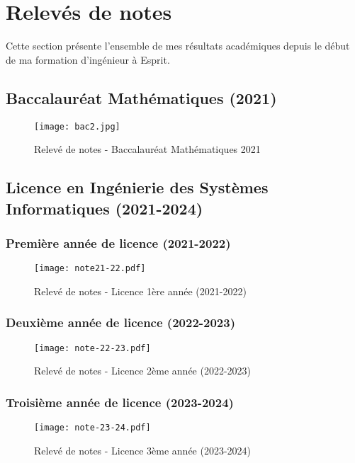 \documentclass[12pt,a4paper]{report}
\begin{document}
\section{Relevés de notes}

Cette section présente l'ensemble de mes résultats académiques depuis le début de ma formation d'ingénieur à Esprit.

\subsection{Baccalauréat Mathématiques (2021)}

\begin{figure}[H]
    \centering
    \texttt{[image: bac2.jpg]}
    \caption{Relevé de notes - Baccalauréat Mathématiques 2021}
    \label{fig:transcript_bac}
\end{figure}

\subsection{Licence en Ingénierie des Systèmes Informatiques (2021-2024)}

\subsubsection{Première année de licence (2021-2022)}
\begin{figure}[H]
    \centering
    \texttt{[image: note21-22.pdf]}
    \caption{Relevé de notes - Licence 1ère année (2021-2022)}
    \label{fig:transcript_L1}
\end{figure}

\subsubsection{Deuxième année de licence (2022-2023)}
\begin{figure}[H]
    \centering
    \texttt{[image: note-22-23.pdf]}
    \caption{Relevé de notes - Licence 2ème année (2022-2023)}
    \label{fig:transcript_L2}
\end{figure}

\subsubsection{Troisième année de licence (2023-2024)}
\begin{figure}[H]
    \centering
    \texttt{[image: note-23-24.pdf]}
    \caption{Relevé de notes - Licence 3ème année (2023-2024)}
    \label{fig:transcript_L3}
\end{figure}
\end{document}
